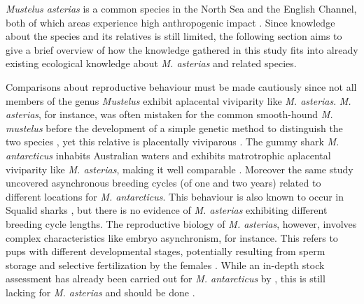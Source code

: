 \documentclass[
  authoryear,
  review,
  3p]{elsarticle}
\begin{document}
\emph{Mustelus asterias} is a common species in the North Sea and the
English Channel, both of which areas experience high anthropogenic
impact \citep{hernandezfarinas_2014}. Since knowledge about the species
and its relatives is still limited, the following section aims to give a
brief overview of how the knowledge gathered in this study fits into
already existing ecological knowledge about \emph{M. asterias} and
related species.

Comparisons about reproductive behaviour must be made cautiously since
not all members of the genus \emph{Mustelus} exhibit aplacental
viviparity like \emph{M. asterias}. \emph{M. asterias}, for instance,
was often mistaken for the common smooth-hound \emph{M. mustelus} before
the development of a simple genetic method to distinguish the two
species \citep{farrell_2009}, yet this relative is placentally
viviparous \citep{dasilva_2018}. The gummy shark \emph{M. antarcticus}
inhabits Australian waters and exhibits matrotrophic aplacental
viviparity like \emph{M. asterias}, making it well comparable
\citep{walker_2007}. Moreover the same study uncovered asynchronous
breeding cycles (of one and two years) related to different locations
for \emph{M. antarcticus}. This behaviour is also known to occur in
Squalid sharks \citep{braccini_2006}, but there is no evidence of
\emph{M. asterias} exhibiting different breeding cycle lengths. The
reproductive biology of \emph{M. asterias}, however, involves complex
characteristics like embryo asynchronism, for instance. This refers to
pups with different developmental stages, potentially resulting from
sperm storage and selective fertilization by the females
\citep{farrell_2010a}. While an in-depth stock assessment has already
been carried out for \emph{M. antarcticus} by \citet{pribac_2005}, this
is still lacking for \emph{M. asterias} and should be done
\citep{mccullyphillips_2015}.
\end{document}

